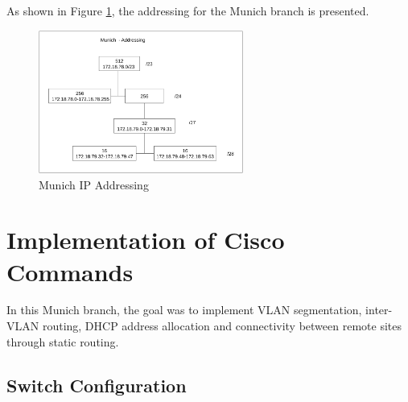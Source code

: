 \begin{table}[h]
\centering
{}
\caption{Munich \ac{WAN} \ac{IP} addressing scheme}
\label{tab:munich-addressing}
\end{table}


As shown in Figure \ref{fig:munichaddressing}, the addressing for the Munich branch is presented.

\begin{figure}[!htb]
\centering
\includegraphics[width=0.6\textwidth]{figures/munich_addressing.png}
\caption{\label{fig:munichaddressing}Munich IP Addressing}
\end{figure}

\section{Implementation of Cisco Commands}

In this Munich branch, the goal was to implement VLAN segmentation, inter-VLAN routing, DHCP address allocation and connectivity between remote sites through static routing.

\subsection*{Switch Configuration}

